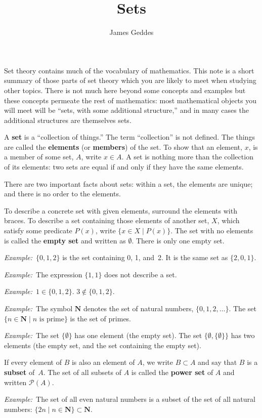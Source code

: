 \documentclass[12pt, a4paper]{article}
\title{\vspace{-6ex}Sets}
\author{James Geddes}
\newcommand{\defn}[1]{\textbf{#1}}
\newcommand{\set}[1]{\mathbold{#1}}
\newcommand{\eg}{\emph{Example:}\relax}
\begin{document}
\maketitle

Set theory contains much of the vocabulary of mathematics. This note
is a short summary of those parts of set theory which you are likely
to meet when studying other topics. There is not much here beyond some
concepts and examples but these concepts permeate the rest of
mathematics: most mathematical objects you will meet will be “sets,
with some additional structure,” and in many cases the additional
structures are themselves sets.

A \defn{set} is a “collection of things.” The term “collection” is not
defined. The things are called the \defn{elements} (or \defn{members})
of the set. To show that an element, $x$, is a member of some set,
$A$, write $x \in A$. A set is nothing more than the collection of its
elements: two sets are equal if and only if they have the same elements.

There are two important facts about sets: within a set, the elements
are unique; and there is no order to the elements.

To describe a concrete set with given elements, surround the elements
with braces. To describe a set containing those elements of another
set, $X$, which satisfy some predicate $P(x)$, write $\{x \in X \mid
P(x)\}$. The set with no elements is called the \defn{empty set} and
written as $\emptyset$. There is only one empty set.

\eg\ $\{0, 1, 2\}$ is the set containing 0, 1, and~2. It is the same
set as $\{2,0,1\}$.

\eg\ The expression $\{1, 1\}$ does not describe a set.

\eg\ $1\in\{0,1,2\}$. $3\notin\{0,1,2\}$.

\eg\ The symbol $\set{N}$ denotes the set of natural numbers,
$\{0,1,2,\dotsc\}$. The set $\{n \in \set{N} \mid \text{$n$ is prime}\}$ is
the set of primes.

\eg\ The set $\{\emptyset\}$ has one element (the empty set). The set $\{\emptyset,
\{\emptyset\}\}$ has two elements (the empty set, and the set containing the
empty set).

If every element of $B$ is also an element of $A$, we write $B \subset A$
and say that $B$ is a \defn{subset} of~$A$. The set of all subsets of
$A$ is called the \defn{power set} of $A$ and written $\mathcal{P}(A)$.

\eg\ The set of all even natural numbers is a subset of the set of all
natural numbers: $\{2n \mid n \in \set{N}\} \subset \set{N}$.
\end{document}
